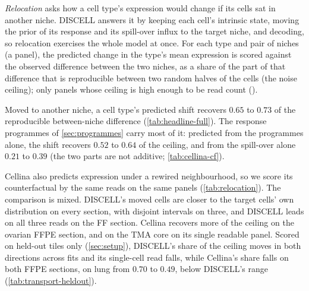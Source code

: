 \emph{Relocation} asks how a cell type's expression would change if its cells sat in another niche. DISCELL answers it by keeping each cell's intrinsic state, moving the prior of its response and its spill-over influx to the target niche, and decoding, so relocation exercises the whole model at once. For each type and pair of niches (a panel), the predicted change in the type's mean expression is scored against the observed difference between the two niches, as a share of the part of that difference that is reproducible between two random halves of the cells (the noise ceiling); only panels whose ceiling is high enough to be read count ().

Moved to another niche, a cell type's predicted shift recovers $0.65$ to $0.73$ of the reproducible between-niche difference (\cref{tab:headline-full}). The response programmes of \cref{sec:programmes} carry most of it: predicted from the programmes alone, the shift recovers $0.52$ to $0.64$ of the ceiling, and from the spill-over alone $0.21$ to $0.39$ (the two parts are not additive; \cref{tab:cellina-cf}).

Cellina \citep{moeed2026cellina} also predicts expression under a rewired neighbourhood, so we score its counterfactual by the same reads on the same panels (\cref{tab:relocation}). The comparison is mixed. DISCELL's moved cells are closer to the target cells' own distribution on every section, with disjoint intervals on three, and DISCELL leads on all three reads on the FF section. Cellina recovers more of the ceiling on the ovarian FFPE section, and on the TMA core on its single readable panel. Scored on held-out tiles only (\cref{sec:setup}), DISCELL's share of the ceiling moves in both directions across fits and its single-cell read falls, while Cellina's share falls on both FFPE sections, on lung from $0.70$ to $0.49$, below DISCELL's range (\cref{tab:transport-heldout}).

